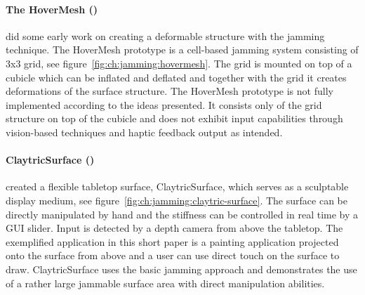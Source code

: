 \paragraph{The HoverMesh (\citeyear{mazzone2004hovermesh})}
\label{ch:jamming:related-work:hci:hovermesh}
\citet{mazzone2004hovermesh} did some early work on creating a deformable structure with the jamming technique. 
The HoverMesh prototype is a cell-based jamming system consisting of 3x3 grid, see figure~\ref{fig:ch:jamming:hovermesh}.
The grid is mounted on top of a cubicle which can be inflated and deflated and together with the grid it creates deformations of the surface structure.
The HoverMesh prototype is not fully implemented according to the ideas presented.
It consists only of the grid structure on top of the cubicle and does not exhibit input capabilities through vision-based techniques and haptic feedback output as intended. 

\paragraph{ClaytricSurface (\citeyear{matoba2012claytricsurface})}
\label{ch:jamming:related-work:hci:claytric}
\citet{matoba2012claytricsurface} created a flexible tabletop surface, ClaytricSurface, which serves as a sculptable display medium, see figure~\ref{fig:ch:jamming:claytric-surface}. 
The surface can be directly manipulated by hand and the stiffness can be controlled in real time by a GUI slider.
Input is detected by a depth camera from above the tabletop.
The exemplified application in this short paper is a painting application projected onto the surface from above and a user can use direct touch on the surface to draw. 
ClaytricSurface uses the basic jamming approach and demonstrates the use of a rather large jammable surface area with direct manipulation abilities.

